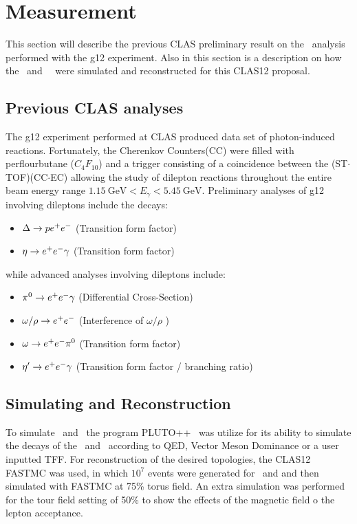 \section{Measurement}\label{sec:measurement}
This section will describe the previous CLAS preliminary result on the \etaTP \ analysis performed with the g12 experiment. Also in this section is a description on how the \etaDal \ and \ \phiDal \ were simulated and reconstructed for this CLAS12 proposal.
\subsection{Previous CLAS analyses}
The g12 experiment performed at CLAS produced data set of photon-induced reactions. Fortunately, the Cherenkov Counters(CC) were filled with perflourbutane ($C_4F_{10}$) and a trigger consisting of a coincidence between the (ST$\cdot$TOF)(CC$\cdot$EC) allowing the study of dilepton reactions throughout the entire beam energy range $1.15 \ \mathrm{GeV}<E_\gamma <5.45 \ \mathrm{GeV}$. Preliminary analyses of g12 involving dileptons include the decays:
\begin{itemize}
\item $\Delta \to p e^+e^-$ (Transition form factor)
\item $\eta \to e^+e^- \gamma$ (Transition form factor)
\end{itemize}

while advanced analyses involving dileptons include:
\begin{itemize}
\item $\pi^{0} \to e^+e^- \gamma$ (Differential Cross-Section)
\item $\omega / \rho \to e^+e^-$ (Interference of $\omega/\rho$ )
\item $\omega \to e^+e^- \pi^{0}$ (Transition form factor)
\item $\eta^{\prime} \to e^+e^- \gamma$ (Transition form factor / branching ratio)
\end{itemize}
\subsection{Simulating and Reconstruction}
To simulate \etaPR \ and \phiPR \ the program PLUTO++~\cite{PLUTO} was utilize for its ability to simulate the decays of the \etaPDal \ and \phiDal \ according to QED, Vector Meson Dominance or a user inputted TFF. For reconstruction of the desired topologies, the CLAS12 FASTMC was used, in which $10^7$ events were generated for \etaPDal \ and \phiDal and then simulated with FASTMC at 75\% torus field. An extra simulation was performed for the tour field setting of 50\% to show the effects of the magnetic field o the lepton acceptance.
